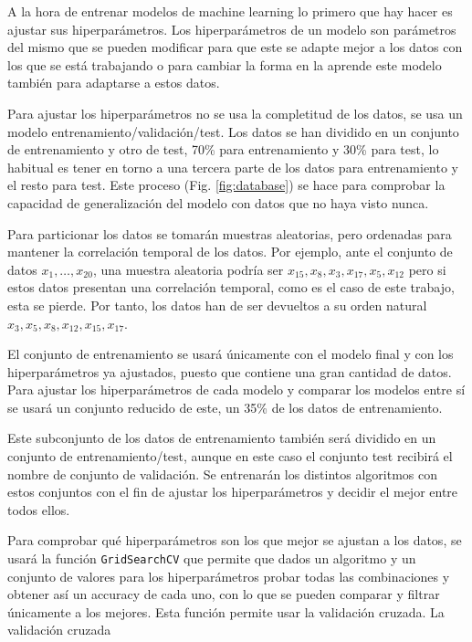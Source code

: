 A la hora de entrenar modelos de machine learning lo primero que hay hacer es ajustar sus hiperparámetros. Los hiperparámetros de un modelo son parámetros del mismo que se pueden modificar para que este se adapte mejor a los datos con los que se está trabajando o para cambiar la forma en la aprende este modelo también para adaptarse a estos datos.

Para ajustar los hiperparámetros no se usa la completitud de los datos, se usa un modelo entrenamiento/validación/test. Los datos se han dividido en un conjunto de entrenamiento y otro de test, 70\% para entrenamiento y 30\% para test, lo habitual es tener en torno a una tercera parte de los datos para entrenamiento y el resto para test. Este proceso (Fig. \ref{fig:database}) se hace para comprobar la capacidad de generalización del modelo con datos que no haya visto nunca.

Para particionar los datos se tomarán muestras aleatorias, pero ordenadas para mantener la correlación temporal de los datos. Por ejemplo, ante el conjunto de datos $x_1, \dots, x_{20}$, una muestra aleatoria podría ser $x_{15}, x_8, x_3, x_{17}, x_5, x_{12}$ pero si estos datos presentan una correlación temporal, como es el caso de este trabajo, esta se pierde. Por tanto, los datos han de ser devueltos a su orden natural $x_3, x_5, x_8, x_{12}, x_{15}, x_{17}$. 

El conjunto de entrenamiento se usará únicamente con el modelo final y con los hiperparámetros ya ajustados, puesto que contiene una gran cantidad de datos. Para ajustar los hiperparámetros de cada modelo y comparar los modelos entre sí se usará un conjunto reducido de este, un 35\% de los datos de entrenamiento.

Este subconjunto de los datos de entrenamiento también será dividido en un conjunto de entrenamiento/test, aunque en este caso el conjunto test recibirá el nombre de  conjunto de validación. Se entrenarán los distintos algoritmos con estos conjuntos con el fin de ajustar los hiperparámetros y decidir el mejor entre todos ellos.

Para comprobar qué hiperparámetros son los que mejor se ajustan a los datos, se usará la función \texttt{GridSearchCV} \cite{scikitgrid} que permite que dados un algoritmo y un conjunto de valores para los hiperparámetros probar todas las combinaciones y obtener así un accuracy de cada uno, con lo que se pueden comparar y filtrar únicamente a los mejores. Esta función permite usar la validación cruzada. La validación cruzada 

